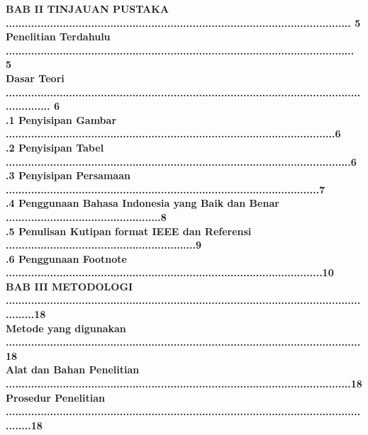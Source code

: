 \textbf{\indent BAB II TINJAUAN PUSTAKA ............................................................................................................. 5}\\
\textbf{\indent {} \indent	Penelitian Terdahulu .............................................................................................................. 5}\\
\textbf{\indent {} \indent	Dasar Teori .............................................................................................................................. 6}\\
\textbf{\indent \indent {}.1 \indent Penyisipan Gambar ........................................................................................................6}\\
\textbf{\indent \indent {}.2 \indent	Penyisipan Tabel .............................................................................................................6}\\
\textbf{\indent \indent {}.3 \indent	Penyisipan Persamaan ...................................................................................................7}\\
\textbf{\indent \indent {}.4 \indent Penggunaan Bahasa Indonesia yang Baik dan Benar .................................................8}\\
\textbf{\indent \indent {}.5 \indent Penulisan Kutipan format IEEE dan Referensi ............................................................9}\\
\textbf{\indent \indent {}.6	 \indent Penggunaan Footnote ....................................................................................................10}\\
\textbf{\indent BAB III METODOLOGI .........................................................................................................................18}\\
\textbf{\indent {} Metode yang digunakan ................................................................................................................18}\\
\textbf{\indent {} Alat dan Bahan Penelitian .............................................................................................................18}\\
\textbf{\indent {} Prosedur Penelitian ........................................................................................................................18}\\

